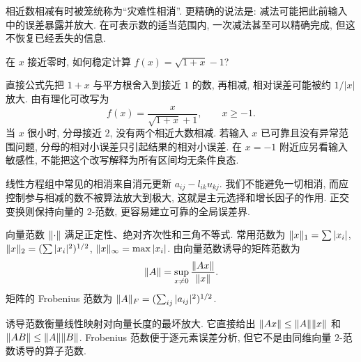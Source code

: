 相近数相减有时被笼统称为“灾难性相消”. 更精确的说法是: 减法可能把此前输入中的误差暴露并放大. 在可表示数的适当范围内, 一次减法甚至可以精确完成, 但这不恢复已经丢失的信息.

\begin{example}
在 $x$ 接近零时, 如何稳定计算 $f(x)=\sqrt{1+x}-1$?
\end{example}
\begin{solution}
直接公式先把 $1+x$ 与平方根舍入到接近 $1$ 的数, 再相减, 相对误差可能被约 $1/|x|$ 放大. 由有理化可改写为
\[
f(x)=\frac{x}{\sqrt{1+x}+1},\qquad x\ge-1.
\]
当 $x$ 很小时, 分母接近 $2$, 没有两个相近大数相减. 若输入 $x$ 已可靠且没有异常范围问题, 分母的相对小误差只引起结果的相对小误差. 在 $x=-1$ 附近应另看输入敏感性, 不能把这个改写解释为所有区间均无条件良态.
\end{solution}
线性方程组中常见的相消来自消元更新 $a_{ij}-l_{ik}u_{kj}$. 我们不能避免一切相消, 而应控制参与相减的数不被算法放大到极大, 这就是主元选择和增长因子的作用. 正交变换则保持向量的 $2$-范数, 更容易建立可靠的全局误差界.

\begin{definition}
向量范数 $\lVert \cdot\rVert$ 满足正定性、绝对齐次性和三角不等式. 常用范数为 $\lVert x\rVert_1=\sum|x_i|$, $\lVert x\rVert_2=(\sum|x_i|^2)^{1/2}$, $\lVert x\rVert_\infty=\max|x_i|$. 由向量范数诱导的矩阵范数为
\[
\lVert A\rVert=\sup_{x\ne0}\frac{\lVert Ax\rVert}{\lVert x\rVert}.
\]
矩阵的 Frobenius 范数为 $\lVert A\rVert_F=(\sum_{ij}|a_{ij}|^2)^{1/2}$.
\end{definition}
诱导范数衡量线性映射对向量长度的最坏放大. 它直接给出 $\lVert Ax\rVert\le\lVert A\rVert\lVert x\rVert$ 和 $\lVert AB\rVert\le\lVert A\rVert\lVert B\rVert$. Frobenius 范数便于逐元素误差分析, 但它不是由同维向量 $2$-范数诱导的算子范数.

